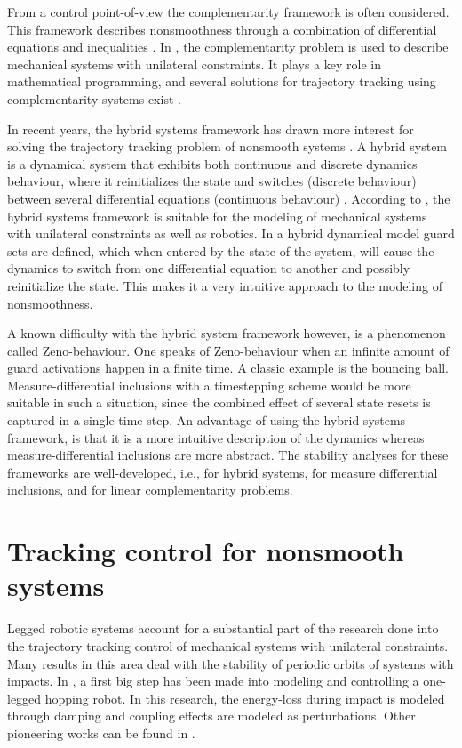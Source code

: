 \documentclass[../DC2017114Bouma.tex]{subfiles}
\begin{document}
From a control point-of-view the complementarity framework is often considered. This framework describes nonsmoothness through a combination of differential equations and inequalities \cite{VanDerSchaft1998,Heemels1999}. In \cite{Glocker2001}, the complementarity problem is used to describe mechanical systems with unilateral constraints. It plays a key role in mathematical programming, and several solutions for trajectory tracking using complementarity systems exist \cite{Bourgeot2005,Morarescu2010}. 

In recent years, the hybrid systems framework has drawn more interest for solving the trajectory tracking problem of nonsmooth systems \cite{Hyun2014,Morris2009}. A hybrid system is a dynamical system that exhibits both continuous and discrete dynamics behaviour, where it reinitializes the state and switches (discrete behaviour) between several differential equations (continuous behaviour) \cite{Goebel2009}. According to \cite{Ding2011a}, the hybrid systems framework is suitable for the modeling of mechanical systems with unilateral constraints as well as robotics. In a hybrid dynamical model guard sets are defined, which when entered by the state of the system, will cause the dynamics to switch from one differential equation to another and possibly reinitialize the state. This makes it a very intuitive approach to the modeling of nonsmoothness. 

A known difficulty with the hybrid system framework however, is a phenomenon called Zeno-behaviour. One speaks of Zeno-behaviour when an infinite amount of guard activations happen in a finite time. A classic example is the bouncing ball. Measure-differential inclusions with a timestepping scheme would be more suitable in such a situation, since the combined effect of several state resets is captured in a single time step. An advantage of using the hybrid systems framework, is that it is a more intuitive description of the dynamics whereas measure-differential inclusions are more abstract. The stability analyses for these frameworks are well-developed, i.e., \cite{Ye1998,Lygeros2003,Goebel2009} for hybrid systems, \cite{Pereira2004,Brogliato2004,Leine2008} for measure differential inclusions, and \cite{Brogliato1999,Camlibel2006,Camlibel2007} for linear complementarity problems.

\section{Tracking control for nonsmooth systems}
Legged robotic systems account for a substantial part of the research done into the trajectory tracking control of mechanical systems with unilateral constraints. Many results in this area deal with the stability of periodic orbits of systems with impacts. In \cite{Raibert1984}, a first big step has been made into modeling and controlling a one-legged hopping robot. In this research, the energy-loss during impact is modeled through damping and coupling effects are modeled as perturbations. Other pioneering works can be found in \cite{Lebaudy1993,Michalska1996,Gregorio1997}. 
\end{document}
